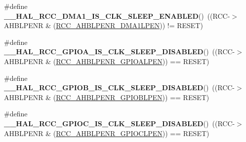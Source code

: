 \begin{DoxyCompactItemize}
\item 
\hypertarget{group___r_c_c___a_h_b___clock___sleep___enable___disable___status_ga2840d82c5565e7690a69a6848fa50fea}{\#define {\bfseries \-\_\-\-\_\-\-H\-A\-L\-\_\-\-R\-C\-C\-\_\-\-D\-M\-A1\-\_\-\-I\-S\-\_\-\-C\-L\-K\-\_\-\-S\-L\-E\-E\-P\-\_\-\-E\-N\-A\-B\-L\-E\-D}()~((R\-C\-C-\/$>$A\-H\-B\-L\-P\-E\-N\-R \& (\hyperlink{group___peripheral___registers___bits___definition_ga8053aa13396d01a92ab6668dc18024b1}{R\-C\-C\-\_\-\-A\-H\-B\-L\-P\-E\-N\-R\-\_\-\-D\-M\-A1\-L\-P\-E\-N})) != R\-E\-S\-E\-T)}\label{group___r_c_c___a_h_b___clock___sleep___enable___disable___status_ga2840d82c5565e7690a69a6848fa50fea}

\item 
\hypertarget{group___r_c_c___a_h_b___clock___sleep___enable___disable___status_gafb90a4c788e0b1e1dee61e462ada7f17}{\#define {\bfseries \-\_\-\-\_\-\-H\-A\-L\-\_\-\-R\-C\-C\-\_\-\-G\-P\-I\-O\-A\-\_\-\-I\-S\-\_\-\-C\-L\-K\-\_\-\-S\-L\-E\-E\-P\-\_\-\-D\-I\-S\-A\-B\-L\-E\-D}()~((R\-C\-C-\/$>$A\-H\-B\-L\-P\-E\-N\-R \& (\hyperlink{group___peripheral___registers___bits___definition_ga8fdb2dae547fe9b89381c894ae21e08a}{R\-C\-C\-\_\-\-A\-H\-B\-L\-P\-E\-N\-R\-\_\-\-G\-P\-I\-O\-A\-L\-P\-E\-N})) == R\-E\-S\-E\-T)}\label{group___r_c_c___a_h_b___clock___sleep___enable___disable___status_gafb90a4c788e0b1e1dee61e462ada7f17}

\item 
\hypertarget{group___r_c_c___a_h_b___clock___sleep___enable___disable___status_ga2eac033c5d40d9e6eda85985322ece6f}{\#define {\bfseries \-\_\-\-\_\-\-H\-A\-L\-\_\-\-R\-C\-C\-\_\-\-G\-P\-I\-O\-B\-\_\-\-I\-S\-\_\-\-C\-L\-K\-\_\-\-S\-L\-E\-E\-P\-\_\-\-D\-I\-S\-A\-B\-L\-E\-D}()~((R\-C\-C-\/$>$A\-H\-B\-L\-P\-E\-N\-R \& (\hyperlink{group___peripheral___registers___bits___definition_ga1943c1a7faf87f869a4a381bb17fb0ea}{R\-C\-C\-\_\-\-A\-H\-B\-L\-P\-E\-N\-R\-\_\-\-G\-P\-I\-O\-B\-L\-P\-E\-N})) == R\-E\-S\-E\-T)}\label{group___r_c_c___a_h_b___clock___sleep___enable___disable___status_ga2eac033c5d40d9e6eda85985322ece6f}

\item 
\hypertarget{group___r_c_c___a_h_b___clock___sleep___enable___disable___status_ga4dd6a13690da372d5ea52476d0f972c8}{\#define {\bfseries \-\_\-\-\_\-\-H\-A\-L\-\_\-\-R\-C\-C\-\_\-\-G\-P\-I\-O\-C\-\_\-\-I\-S\-\_\-\-C\-L\-K\-\_\-\-S\-L\-E\-E\-P\-\_\-\-D\-I\-S\-A\-B\-L\-E\-D}()~((R\-C\-C-\/$>$A\-H\-B\-L\-P\-E\-N\-R \& (\hyperlink{group___peripheral___registers___bits___definition_ga31961dd470a5be30373cd496ae6da055}{R\-C\-C\-\_\-\-A\-H\-B\-L\-P\-E\-N\-R\-\_\-\-G\-P\-I\-O\-C\-L\-P\-E\-N})) == R\-E\-S\-E\-T)}\label{group___r_c_c___a_h_b___clock___sleep___enable___disable___status_ga4dd6a13690da372d5ea52476d0f972c8}


\end{DoxyCompactItemize}
